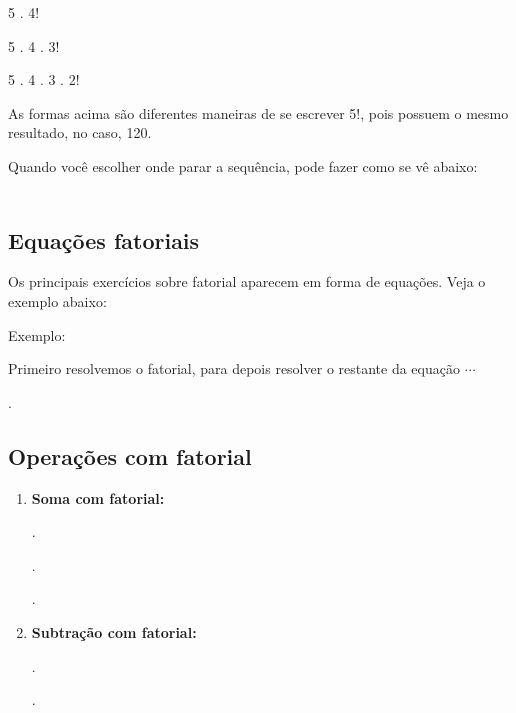 \begin{multicols*}{2}
	5 . 4!

	5 . 4 . 3!

	5 . 4 . 3 . 2!

	As formas acima são diferentes maneiras de se escrever 5!, pois possuem o mesmo resultado, no caso, 120.

	Quando você escolher onde parar a sequência, pode fazer como se vê abaixo:\\

	 \\


	\subsection{Equações fatoriais}

	Os principais exercícios sobre fatorial aparecem em forma de equações. Veja o exemplo abaixo:

	Exemplo: 

	Primeiro resolvemos o fatorial, para depois resolver o restante da equação $\cdots $



	.

	\subsection{Operações com fatorial}

	\begin{enumerate}

		\item \textbf{Soma com fatorial:}

		      .

		      .

		      .

		\item \textbf{Subtração com fatorial:}

		      .

		      .


\end{enumerate}
\end{multicols*}
